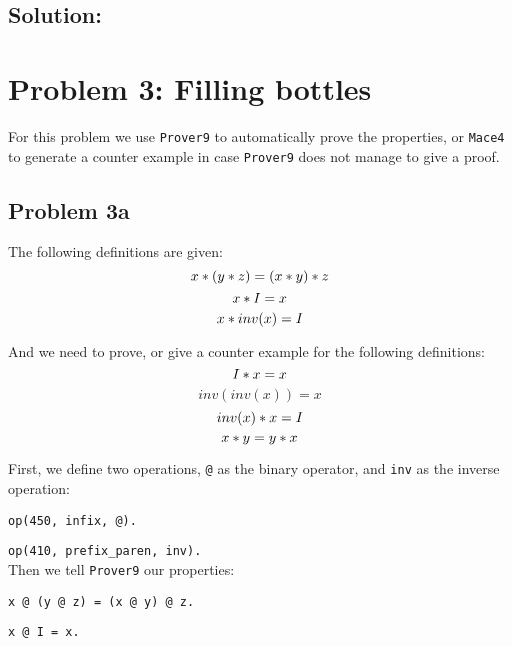 \documentclass[a4paper]{article}
\begin{document}
	\subsection*{Solution:}
	
	
	\section*{Problem 3: Filling bottles}
	For this problem we use {\tt Prover9} to automatically prove the properties, or {\tt Mace4} to generate a counter example in case {\tt Prover9} does not manage to give a proof.
	
	\subsection*{Problem 3a}
	The following definitions are given:
	$$ x \** (y \** z) = (x \** y) \** z$$
	$$x \** I = x$$
	$$x \** inv(x) = I$$
	
	And we need to prove, or give a counter example for the following definitions:
	$$I \** x = x$$
	$$inv(inv(x)) = x$$
	$$inv(x) \** x = I$$ 
	$$x \** y = y \** x$$
	
	First, we define two operations, {\tt @} as the binary operator, and {\tt inv} as the inverse operation:
	
	{\tt op(450, infix, @). }
	
	{\tt op(410, prefix\_paren, inv).}\\
	
	Then we tell {\tt Prover9} our properties: 
	
	{\tt x @ (y @ z) = (x @ y) @ z.}
	
	{\tt x @ I = x.}
	 
\end{document}
